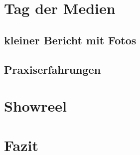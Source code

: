 \clearpage
\section{Tag der Medien}
\subsection{kleiner Bericht mit Fotos}
\subsection{Praxiserfahrungen}

\clearpage
\section{Showreel}

\clearpage
\section{Fazit}


